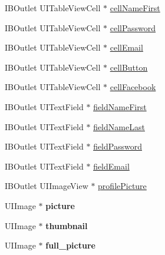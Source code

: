 \begin{DoxyCompactItemize}
\item 
I\+B\+Outlet U\+I\+Table\+View\+Cell $\ast$ \hyperlink{category_e_s_register_view_07_08_a5382959659179f1ea52c4ad5773eb7b1}{cell\+Name\+First}
\item 
I\+B\+Outlet U\+I\+Table\+View\+Cell $\ast$ \hyperlink{category_e_s_register_view_07_08_a8a036d69184622c124502ec3ad0b932b}{cell\+Password}
\item 
I\+B\+Outlet U\+I\+Table\+View\+Cell $\ast$ \hyperlink{category_e_s_register_view_07_08_ac66f6acb48873fb10a77c519fca9c2d3}{cell\+Email}
\item 
I\+B\+Outlet U\+I\+Table\+View\+Cell $\ast$ \hyperlink{category_e_s_register_view_07_08_a25d21fc70664cbcfa522a995545357f3}{cell\+Button}
\item 
I\+B\+Outlet U\+I\+Table\+View\+Cell $\ast$ \hyperlink{category_e_s_register_view_07_08_a4a74d3606bea95c401ecbaba1b12e4b9}{cell\+Facebook}
\item 
I\+B\+Outlet U\+I\+Text\+Field $\ast$ \hyperlink{category_e_s_register_view_07_08_af6448700b6499730b3cca5a68e6b54d5}{field\+Name\+First}
\item 
I\+B\+Outlet U\+I\+Text\+Field $\ast$ \hyperlink{category_e_s_register_view_07_08_a6ccb37528064a73e8e7a1331ad8b0f81}{field\+Name\+Last}
\item 
I\+B\+Outlet U\+I\+Text\+Field $\ast$ \hyperlink{category_e_s_register_view_07_08_ae7095d5eb51b8212c557ae76ee6b1268}{field\+Password}
\item 
I\+B\+Outlet U\+I\+Text\+Field $\ast$ \hyperlink{category_e_s_register_view_07_08_a21999c2e9c5d101ced512c64b0e7a560}{field\+Email}
\item 
I\+B\+Outlet U\+I\+Image\+View $\ast$ \hyperlink{category_e_s_register_view_07_08_a42e9a610f916fec8ad9e989c9cbcf239}{profile\+Picture}
\item 
\hypertarget{category_e_s_register_view_07_08_a58910dc48c43929145ff2941c06654f0}{}U\+I\+Image $\ast$ {\bfseries picture}\label{category_e_s_register_view_07_08_a58910dc48c43929145ff2941c06654f0}

\item 
\hypertarget{category_e_s_register_view_07_08_a97bee207b52049b9b33e71870a8c89a1}{}U\+I\+Image $\ast$ {\bfseries thumbnail}\label{category_e_s_register_view_07_08_a97bee207b52049b9b33e71870a8c89a1}

\item 
\hypertarget{category_e_s_register_view_07_08_a8502164f6da345ca18177e8330472d0d}{}U\+I\+Image $\ast$ {\bfseries full\+\_\+picture}\label{category_e_s_register_view_07_08_a8502164f6da345ca18177e8330472d0d}


\end{DoxyCompactItemize}
